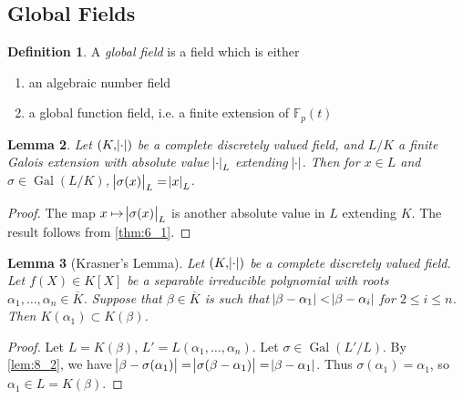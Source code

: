 \documentclass[11pt]{article}
\theoremstyle{definition}
\newtheorem{definition}{Definition}[subsection]
\theoremstyle{plain}
\newtheorem{lemma}[definition]{Lemma}
\theoremstyle{remark}
\DeclareMathOperator{\Gal}{Gal}
\newcommand{\bF}{\mathbb{F}}
\begin{document}
\subsection{Global Fields}

\begin{definition}
    A \emph{global field} is a field which is either
    \begin{enumerate}
        \item an algebraic number field
        \item a global function field, i.e. a finite extension of $\bF_p(t)$
    \end{enumerate}
\end{definition}

\begin{lemma}\label{lem:8_2}
    Let $(K, \abs{\cdot})$ be a complete discretely valued field, and $L/K$ a finite Galois extension with absolute value $\abs{\cdot}_L$ extending $\abs{\cdot}$. Then for $x \in L$ and $\sigma \in \Gal(L/K)$, $\abs{\sigma(x)}_L = \abs{x}_L$.
\end{lemma}
\begin{proof}
    The map $x \mapsto \abs{\sigma(x)}_L$ is another absolute value in $L$ extending $K$. The result follows from \autoref{thm:6_1}.
\end{proof}

\begin{lemma}[Krasner's Lemma]\label{lem:8_3}
    Let $(K, \abs{\cdot})$ be a complete discretely valued field. Let $f(X) \in K[X]$ be a separable irreducible polynomial with roots $\alpha_1, \ldots, \alpha_n \in \overline{K}$. Suppose that $\beta \in \overline{K}$ is such that $\abs{\beta - \alpha_1} < \abs{\beta - \alpha_i}$ for $2 \le i \le n$. Then $K(\alpha_1) \subset K(\beta)$.
\end{lemma}
\begin{proof}
    Let $L = K(\beta)$, $L' = L(\alpha_1, \ldots, \alpha_n)$. Let $\sigma \in \Gal(L' / L)$. By \autoref{lem:8_2}, we have $\abs{\beta - \sigma(\alpha_1)} = \abs{\sigma(\beta - \alpha_1)} = \abs{\beta - \alpha_1}$. Thus $\sigma(\alpha_1) = \alpha_1$, so $\alpha_1 \in L = K(\beta)$.
\end{proof}
\end{document}
